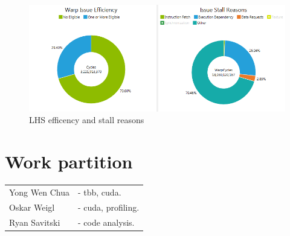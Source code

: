 \documentclass[11pt, oneside, a4paper]{article}
\begin{document}
\begin{figure}[tb]
	\begin{center}
		\includegraphics[]{LHS efficency and stall reason}
	\end{center}
	\caption{LHS efficency and stall reasons}
	\label{fig:issue_eff_and_stall_reasons}
\end{figure}




\section{Work partition} %
\label{sec:work_partition}
\begin{tabular}{ l l  }
Yong Wen Chua & - tbb, cuda. \\
Oskar Weigl & - cuda, profiling. \\
Ryan Savitski & - code analysis. \\
\end{tabular}
\end{document}
